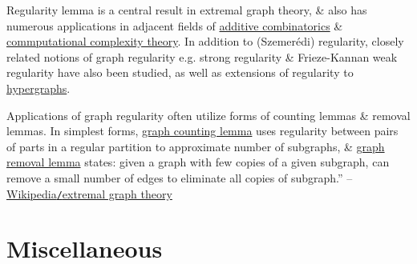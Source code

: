 \documentclass{article}
\begin{document}
\begin{itemize}
	Regularity lemma is a central result in extremal graph theory, \& also has numerous applications in adjacent fields of \href{https://en.wikipedia.org/wiki/Additive_combinatorics}{additive combinatorics} \& \href{https://en.wikipedia.org/wiki/Computational_complexity_theory}{commputational complexity theory}. In addition to (Szemerédi) regularity, closely related notions of graph regularity e.g. strong regularity \& Frieze-Kannan weak regularity have also been studied, as well as extensions of regularity to \href{https://en.wikipedia.org/wiki/Hypergraphs}{hypergraphs}.
	
	Applications of graph regularity often utilize forms of counting lemmas \& removal lemmas. In simplest forms, \href{https://en.wikipedia.org/wiki/Graph_removal_lemma#graph_counting_lemma}{graph counting lemma} uses regularity between pairs of parts in a regular partition to approximate number of subgraphs, \& \href{https://en.wikipedia.org/wiki/Graph_removal_lemma}{graph removal lemma} states: given a graph with few copies of a given subgraph, can remove a small number of edges to eliminate all copies of subgraph.'' -- \href{https://en.wikipedia.org/wiki/Extremal_graph_theory}{Wikipedia{\tt/}extremal graph theory}
\end{itemize}


\section{Miscellaneous}


\printbibliography[heading=bibintoc]
	
\end{document}
